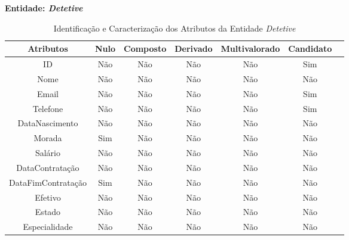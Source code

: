 \documentclass[a4paper,12pt]{scrreprt}
\newcommand{\Nao}{%
    \cellcolor{red!40}Não
}
\newcommand{\Sim}{%
    \cellcolor{green!40}Sim
}
\begin{document}
        \clearpage
        
        
        \textbf{Entidade: \textit{Detetive}}
        \begin{table}[!ht]
        \centering
        \begin{tabular}{|c|c|c|c|c|c|c|}
        \hline
        \rowcolor{gray!20!white}
        \textbf{Atributos} & \textbf{Nulo} & \textbf{Composto} & \textbf{Derivado} & \textbf{Multivalorado} & \textbf{Candidato} \\
        \hline
        ID                 & \Nao & \Nao & \Nao & \Nao & \Sim \\
        Nome               & \Nao & \Nao & \Nao & \Nao & \Nao \\
        Email              & \Nao & \Nao & \Nao & \Nao & \Sim \\
        Telefone           & \Nao & \Nao & \Nao & \Nao & \Sim \\
        DataNascimento     & \Nao & \Nao & \Nao & \Nao & \Nao \\
        Morada             & \Sim & \Nao & \Nao & \Nao & \Nao \\
        Salário            & \Nao & \Nao & \Nao & \Nao & \Nao \\
        DataContratação    & \Nao & \Nao & \Nao & \Nao & \Nao \\
        DataFimContratação & \Sim & \Nao & \Nao & \Nao & \Nao \\
        Efetivo            & \Nao & \Nao & \Nao & \Nao & \Nao \\
        Estado             & \Nao & \Nao & \Nao & \Nao & \Nao \\
        Especialidade      & \Nao & \Nao & \Nao & \Nao & \Nao \\
        \hline
        \end{tabular}
        \caption{Identificação e Caracterização dos Atributos da Entidade \textit{Detetive}}
        \end{table}
\end{document}
